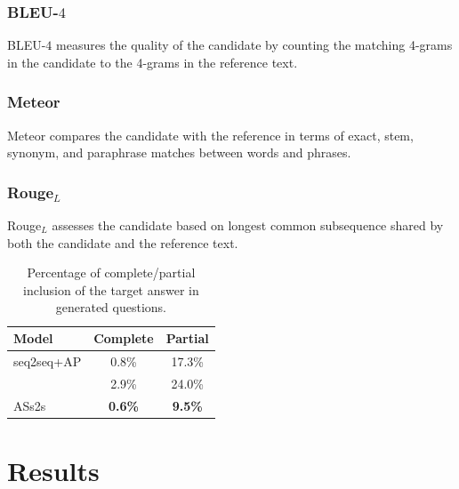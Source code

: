\documentclass[letterpaper]{article} %
\newcommand\Tstrut{\rule{0pt}{2.3ex}}         %
\begin{document}
\subsubsection{BLEU-\(4\)}
BLEU-\(4\) measures the quality of the candidate by counting the matching 4-grams in the candidate to the 4-grams in the reference text.

\subsubsection{Meteor}
Meteor compares the candidate with the reference in terms of exact, stem, synonym, and paraphrase matches between words and phrases.
%
%
%

\subsubsection{Rouge\(_L\)}
Rouge\(_L\) assesses the candidate based on longest common subsequence shared by both the candidate and the reference text.

\begin{table}[!tb]
\centering
\begin{tabular}{|l|c|c|}
\hline
Model        & Complete & Partial\Tstrut  \\ \hline
seq2seq+AP & 0.8\%            & 17.3\%\Tstrut               \\ \hline
\cite{song2018leveraging}  & 2.9\%        & 24.0\%\Tstrut          \\ \hline
ASs2s    & \textbf{0.6\%}        & \textbf{9.5\%}\Tstrut           \\ \hline
\end{tabular}%
\caption{Percentage of complete/partial inclusion of the target answer in generated questions.}
\label{table:grasp answer}
\end{table}

\section{Results}
\end{document}
